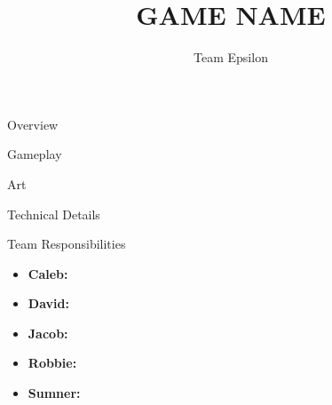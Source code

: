 \documentclass{teamepsilon}
\title{GAME NAME}
\author{Team Epsilon}
\institute{Colorado School of Mines}
\begin{document}
\begin{frame}{Overview}

\end{frame}

\begin{frame}{Gameplay}

\end{frame}

\begin{frame}{Art}

\end{frame}

\begin{frame}{Technical Details}

\end{frame}

\begin{frame}{Team Responsibilities}
    \begin{itemize}
        \item \textbf{Caleb:}
        \item \textbf{David:}
        \item \textbf{Jacob:}
        \item \textbf{Robbie:}
        \item \textbf{Sumner:}
    \end{itemize}
\end{frame}
\end{document}
